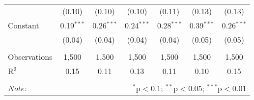\documentclass[
]{article}
\begin{document}
\begin{sidewaystable}[!htbp]
\begin{tabular}{@{\extracolsep{1pt}}lcccccc}
  & (0.10) & (0.10) & (0.10) & (0.11) & (0.13) & (0.13) \\ 
  Constant & 0.19$^{***}$ & 0.26$^{***}$ & 0.24$^{***}$ & 0.28$^{***}$ & 0.39$^{***}$ & 0.26$^{***}$ \\ 
  & (0.04) & (0.04) & (0.04) & (0.04) & (0.05) & (0.05) \\ 
 \hline \\[-1.8ex] 
Observations & 1,500 & 1,500 & 1,500 & 1,500 & 1,500 & 1,500 \\ 
R$^{2}$ & 0.15 & 0.11 & 0.13 & 0.11 & 0.10 & 0.15 \\ 
\hline 
\hline \\[-1.8ex] 
\textit{Note:}  & \multicolumn{6}{r}{$^{*}$p$<$0.1; $^{**}$p$<$0.05; $^{***}$p$<$0.01} \\ 
\end{tabular} 
\end{sidewaystable}
\end{document}
